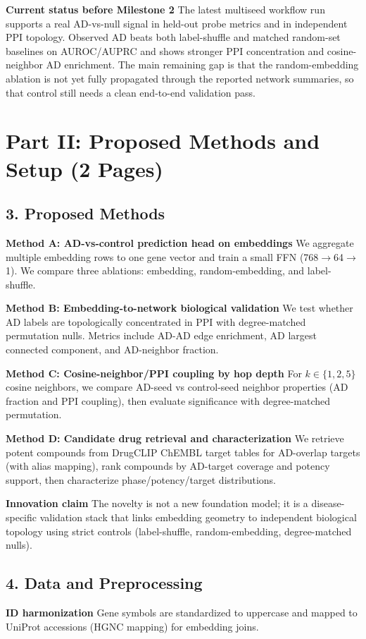 \documentclass{article}
\begin{document}
\textbf{Current status before Milestone 2} The latest multiseed workflow run supports a real AD-vs-null signal in held-out probe metrics and in independent PPI topology. Observed AD beats both label-shuffle and matched random-set baselines on AUROC/AUPRC and shows stronger PPI concentration and cosine-neighbor AD enrichment. The main remaining gap is that the random-embedding ablation is not yet fully propagated through the reported network summaries, so that control still needs a clean end-to-end validation pass.

\section*{Part II: Proposed Methods and Setup (2 Pages)}

\subsection*{3. Proposed Methods}
\textbf{Method A: AD-vs-control prediction head on embeddings} We aggregate multiple embedding rows to one gene vector and train a small FFN (768$\rightarrow$64$\rightarrow$1). We compare three ablations: embedding, random-embedding, and label-shuffle.

\textbf{Method B: Embedding-to-network biological validation} We test whether AD labels are topologically concentrated in PPI with degree-matched permutation nulls. Metrics include AD-AD edge enrichment, AD largest connected component, and AD-neighbor fraction.

\textbf{Method C: Cosine-neighbor/PPI coupling by hop depth} For $k\in\{1,2,5\}$ cosine neighbors, we compare AD-seed vs control-seed neighbor properties (AD fraction and PPI coupling), then evaluate significance with degree-matched permutation.

\textbf{Method D: Candidate drug retrieval and characterization} We retrieve potent compounds from DrugCLIP ChEMBL target tables for AD-overlap targets (with alias mapping), rank compounds by AD-target coverage and potency support, then characterize phase/potency/target distributions.

\textbf{Innovation claim} The novelty is not a new foundation model; it is a disease-specific validation stack that links embedding geometry to independent biological topology using strict controls (label-shuffle, random-embedding, degree-matched nulls).

\subsection*{4. Data and Preprocessing}
\textbf{ID harmonization} Gene symbols are standardized to uppercase and mapped to UniProt accessions (HGNC mapping) for embedding joins.
\end{document}
